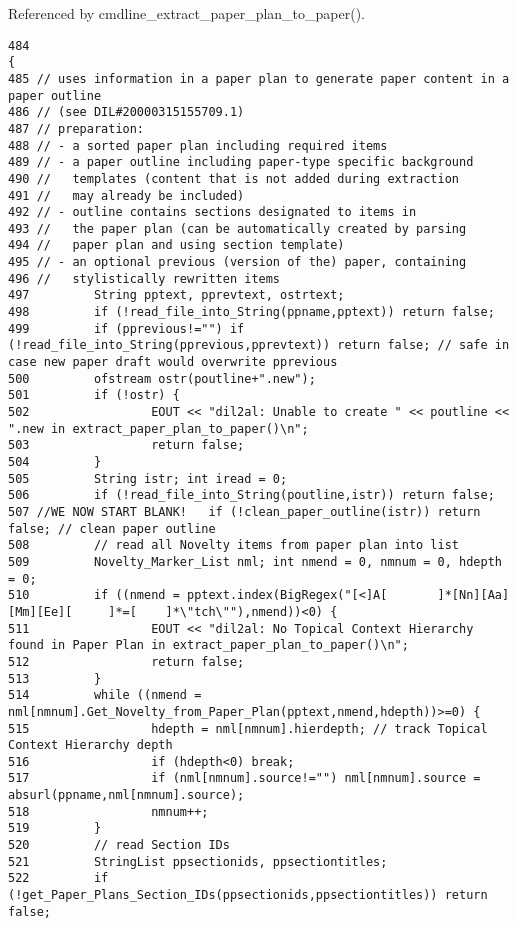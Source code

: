 Referenced by cmdline\_\-extract\_\-paper\_\-plan\_\-to\_\-paper().



\footnotesize\begin{verbatim}484                                                                                    {
485 // uses information in a paper plan to generate paper content in a paper outline
486 // (see DIL#20000315155709.1)
487 // preparation:
488 // - a sorted paper plan including required items
489 // - a paper outline including paper-type specific background
490 //   templates (content that is not added during extraction
491 //   may already be included)
492 // - outline contains sections designated to items in
493 //   the paper plan (can be automatically created by parsing
494 //   paper plan and using section template)
495 // - an optional previous (version of the) paper, containing
496 //   stylistically rewritten items
497         String pptext, pprevtext, ostrtext;
498         if (!read_file_into_String(ppname,pptext)) return false;
499         if (pprevious!="") if (!read_file_into_String(pprevious,pprevtext)) return false; // safe in case new paper draft would overwrite pprevious
500         ofstream ostr(poutline+".new");
501         if (!ostr) {
502                 EOUT << "dil2al: Unable to create " << poutline << ".new in extract_paper_plan_to_paper()\n";
503                 return false;
504         }
505         String istr; int iread = 0;
506         if (!read_file_into_String(poutline,istr)) return false;
507 //WE NOW START BLANK!   if (!clean_paper_outline(istr)) return false; // clean paper outline
508         // read all Novelty items from paper plan into list
509         Novelty_Marker_List nml; int nmend = 0, nmnum = 0, hdepth = 0;
510         if ((nmend = pptext.index(BigRegex("[<]A[       ]*[Nn][Aa][Mm][Ee][     ]*=[    ]*\"tch\""),nmend))<0) {
511                 EOUT << "dil2al: No Topical Context Hierarchy found in Paper Plan in extract_paper_plan_to_paper()\n";
512                 return false;
513         }
514         while ((nmend = nml[nmnum].Get_Novelty_from_Paper_Plan(pptext,nmend,hdepth))>=0) {
515                 hdepth = nml[nmnum].hierdepth; // track Topical Context Hierarchy depth
516                 if (hdepth<0) break;
517                 if (nml[nmnum].source!="") nml[nmnum].source = absurl(ppname,nml[nmnum].source);
518                 nmnum++;
519         }
520         // read Section IDs
521         StringList ppsectionids, ppsectiontitles;
522         if (!get_Paper_Plans_Section_IDs(ppsectionids,ppsectiontitles)) return false;

\end{verbatim}
